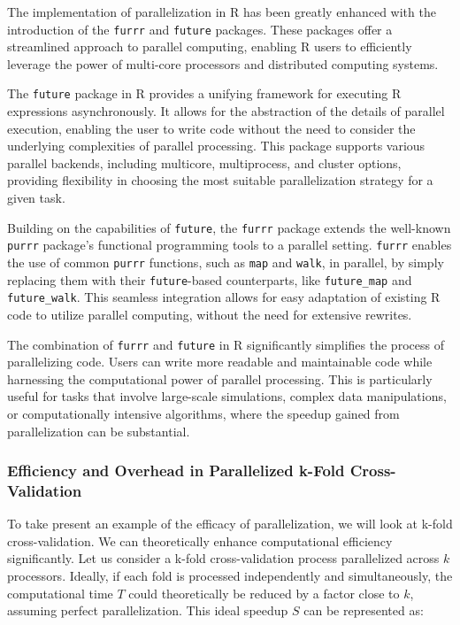 \documentclass[12pt, twoside,hidelinks]{article}
\theoremstyle{definition}
\numberwithin{equation}{section}
\begin{document}
The implementation of parallelization in R has been greatly enhanced with the introduction of the \texttt{furrr} and \texttt{future} packages. These packages offer a streamlined approach to parallel computing, enabling R users to efficiently leverage the power of multi-core processors and distributed computing systems.
\newline

The \texttt{future} package in R provides a unifying framework for executing R expressions asynchronously. It allows for the abstraction of the details of parallel execution, enabling the user to write code without the need to consider the underlying complexities of parallel processing. This package supports various parallel backends, including multicore, multiprocess, and cluster options, providing flexibility in choosing the most suitable parallelization strategy for a given task.
\newline

Building on the capabilities of \texttt{future}, the \texttt{furrr} package extends the well-known \texttt{purrr} package's functional programming tools to a parallel setting. \texttt{furrr} enables the use of common \texttt{purrr} functions, such as \texttt{map} and \texttt{walk}, in parallel, by simply replacing them with their \texttt{future}-based counterparts, like \texttt{future\_map} and \texttt{future\_walk}. This seamless integration allows for easy adaptation of existing R code to utilize parallel computing, without the need for extensive rewrites.
\newline

The combination of \texttt{furrr} and \texttt{future} in R significantly simplifies the process of parallelizing code. Users can write more readable and maintainable code while harnessing the computational power of parallel processing. This is particularly useful for tasks that involve large-scale simulations, complex data manipulations, or computationally intensive algorithms, where the speedup gained from parallelization can be substantial.


\subsubsection*{Efficiency and Overhead in Parallelized k-Fold Cross-Validation}

To take present an example of the efficacy of parallelization, we will look at k-fold cross-validation. We can theoretically enhance computational efficiency significantly. Let us consider a k-fold cross-validation process parallelized across \( k \) processors. Ideally, if each fold is processed independently and simultaneously, the computational time \( T \) could theoretically be reduced by a factor close to \( k \), assuming perfect parallelization. This ideal speedup \( S \) can be represented as:
\end{document}
